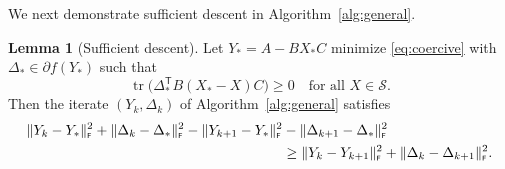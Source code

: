 \documentclass[11pt,reqno]{amsart}
\newcommand{\tp}{{\scriptscriptstyle\mathsf{T}}}
\newcommand{\F}{{\scriptscriptstyle\mathsf{F}}}
\DeclareMathOperator{\tr}{tr}
\theoremstyle{definition}
\newtheorem{lemma}[theorem]{Lemma}
\numberwithin{equation}{section}
\begin{document}
We next demonstrate sufficient descent in Algorithm~\ref{alg:general}.
\begin{lemma}[Sufficient descent]\label{lem:sufficient_descent}
Let $Y_* = A - BX_* C$ minimize \eqref{eq:coercive} with $\Delta_* \in \partial f(Y_*)$ such that 
\begin{equation}\label{eq:D_gradient}
    \tr\bigl(\Delta_*^\tp B(X_*-X)C \bigr)\ge 0 \quad \text{for all } X \in \mathcal{S}.
\end{equation}
Then the iterate $(Y_k,\Delta_k)$ of Algorithm~\ref{alg:general} satisfies
\begin{align}
    \lVert Y_k-Y_* \rVert_\F^2 + \lVert \Delta_k-\Delta_* \rVert_\F^2 - \lVert Y_{k+1} -Y_* \rVert_\F^2 &- \lVert \Delta_{k+1} - \Delta_* \rVert_\F^2 \notag \\
&\ge \lVert Y_k - Y_{k+1} \rVert_\F^2  + \lVert \Delta_k - \Delta_{k+1} \rVert_\F^2. \label{eq:sufficient_descent}
\end{align}
\end{lemma}
\end{document}

